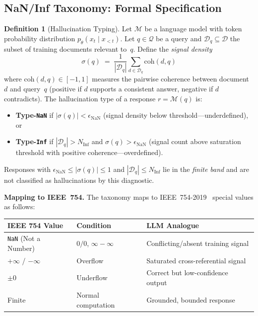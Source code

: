 \documentclass[11pt]{article}
\theoremstyle{definition}
\newtheorem{definition}[theorem]{Definition}
\theoremstyle{remark}
\newcommand{\NaN}{\texttt{NaN}}
\newcommand{\Inf}{\texttt{Inf}}
\begin{document}
\subsection{NaN/Inf Taxonomy: Formal Specification}
\label{sec:nan-inf-formal}

\begin{definition}[Hallucination Typing]
\label{def:hallucination-type}
Let $\mathcal{M}$ be a language model with token probability distribution
$p_\theta(x_t \mid x_{<t})$.  Let $q \in \mathcal{Q}$ be a query and
$\mathcal{D}_q \subseteq \mathcal{D}$ the subset of training documents
relevant to~$q$.  Define the \emph{signal density}
\begin{equation}
  \label{eq:signal-density}
  \sigma(q) \;=\; \frac{1}{|\mathcal{D}_q|}
    \sum_{d \in \mathcal{D}_q} \mathrm{coh}(d, q)
\end{equation}
where $\mathrm{coh}(d, q) \in [-1, 1]$ measures the pairwise coherence
between document~$d$ and query~$q$ (positive if $d$ supports a consistent
answer, negative if $d$ contradicts).  The hallucination type of a response
$r = \mathcal{M}(q)$ is:
\begin{itemize}
  \item \textbf{Type-\NaN{}} if $|\sigma(q)| < \epsilon_{\mathrm{NaN}}$
    (signal density below threshold---underdefined), or
  \item \textbf{Type-\Inf{}} if $|\mathcal{D}_q| > N_{\mathrm{Inf}}$ and
    $\sigma(q) > \epsilon_{\mathrm{NaN}}$ (signal count above saturation
    threshold with positive coherence---overdefined).
\end{itemize}
Responses with $\epsilon_{\mathrm{NaN}} \leq |\sigma(q)| \leq 1$ and
$|\mathcal{D}_q| \leq N_{\mathrm{Inf}}$ lie in the \emph{finite band}
and are not classified as hallucinations by this diagnostic.
\end{definition}

\medskip
\noindent\textbf{Mapping to IEEE~754.}\quad
The taxonomy maps to IEEE~754-2019~\cite{ieee754-2019} special values as
follows:

\begin{center}
\begin{tabular}{lll}
\toprule
\textbf{IEEE 754 Value} & \textbf{Condition} & \textbf{LLM Analogue} \\
\midrule
\texttt{NaN} (Not a Number) & $0/0$, $\infty - \infty$ & Conflicting/absent training signal \\
$+\infty$ / $-\infty$ & Overflow & Saturated cross-referential signal \\
$\pm 0$ & Underflow & Correct but low-confidence output \\
Finite & Normal computation & Grounded, bounded response \\
\bottomrule
\end{tabular}
\end{center}
\end{document}
